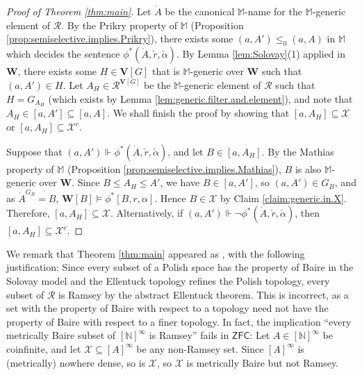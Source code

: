 \documentclass[10pt,a4paper]{amsart}
\theoremstyle{plain}
\numberwithin{equation}{section}
\theoremstyle{definition}
\newcommand{\N}{\mathbb{N}}
\newcommand{\cal}{\mathcal}
\renewcommand{\bf}{\mathbf}
\newcommand{\ZFC}{\mathsf{ZFC}}
\newcommand{\forces}{\Vdash}
\newcommand{\V}{\bf{V}}
\newcommand{\W}{\bf{W}}
\newcommand{\X}{\cal{X}}
\begin{document}
\begin{proof}[Proof of Theorem \ref{thm:main}]
    Let $\dot{A}$ be the canonical $\mathbb{M}$-name for the $\mathbb{M}$-generic element of $\cal{R}$. By the Prikry property of $\mathbb{M}$ (Proposition \ref{prop:semiselective.implies.Prikry}), there exists some $(a,A') \leq_0 (a,A)$ in $\mathbb{M}$ which decides the sentence $\phi^*(\dot{A},\check{r},\check{\alpha})$. By Lemma \ref{lem:Solovay}(1) applied in $\W$, there exists some $H \in \V[G]$ that is $\mathbb{M}$-generic over $\W$ such that $(a,A') \in H$. Let $A_H \in \cal{R}^{\V[G]}$ be the $\mathbb{M}$-generic element of $\cal{R}$ such that $H = G_{A_H}$ (which exists by Lemma \ref{lem:generic.filter.and.element}), and note that $A_H \in [a,A'] \subseteq [a,A]$. We shall finish the proof by showing that $[a,A_H] \subseteq \X$ or $[a,A_H] \subseteq \X^c$. 

    Suppose that $(a,A') \forces \phi^*(\dot{A},\check{r},\check{\alpha})$, and let $B \in [a,A_H]$. By the Mathias property of $\mathbb{M}$ (Proposition \ref{prop:semiselective.implies.Mathias}), $B$ is also $\mathbb{M}$-generic over $\W$. Since $B \leq A_H \leq A'$, we have $B \in [a,A']$, so $(a,A') \in G_B$, and as $\dot{A}^{G_B} = B$, $\W[B] \models \phi^*[B,r,\alpha]$. Hence $B \in \X$ by Claim \ref{claim:generic.in.X}. Therefore, $[a,A_H] \subseteq \X$. Alternatively, if $(a,A') \forces \neg\phi^*(\dot{A},\check{r},\check{\alpha})$, then $[a,A_H] \subseteq \X^c$.
\end{proof}

We remark that Theorem \ref{thm:main} appeared as \cite[Theorem 6.1]{Y24}, with the following justification: Since every subset of a Polish space has the property of Baire in the Solovay model and the Ellentuck topology refines the Polish topology, every subset of $\cal{R}$ is Ramsey by the abstract Ellentuck theorem. This is incorrect, as a set with the property of Baire with respect to a topology need not have the property of Baire with respect to a finer topology. In fact, the implication ``every metrically Baire subset of $[\N]^\infty$ is Ramsey'' fails in $\ZFC$: Let $A \in [\N]^\infty$ be coinfinite, and let $\X \subseteq [A]^\infty$ be any non-Ramsey set. Since $[A]^\infty$ is (metrically) nowhere dense, so is $\X$, so $\X$ is metrically Baire but not Ramsey.




\end{document}
